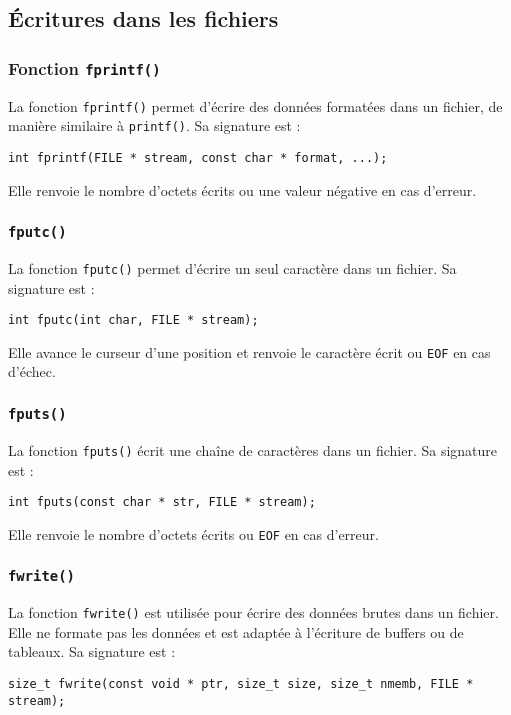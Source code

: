 \documentclass[french,11pt]{article}
\begin{document}
\subsection{Écritures dans les fichiers}

\subsubsection{Fonction \texttt{fprintf()}}
La fonction \texttt{fprintf()} permet d’écrire des données formatées dans un fichier, de manière similaire à \texttt{printf()}. Sa signature est :
\begin{verbatim}
int fprintf(FILE * stream, const char * format, ...);
\end{verbatim}
Elle renvoie le nombre d’octets écrits ou une valeur négative en cas d’erreur.

\subsubsection{\texttt{fputc()}}
La fonction \texttt{fputc()} permet d’écrire un seul caractère dans un fichier. Sa signature est :
\begin{verbatim}
int fputc(int char, FILE * stream);
\end{verbatim}
Elle avance le curseur d’une position et renvoie le caractère écrit ou \texttt{EOF} en cas d’échec.

\subsubsection{\texttt{fputs()}}
La fonction \texttt{fputs()} écrit une chaîne de caractères dans un fichier. Sa signature est :
\begin{verbatim}
int fputs(const char * str, FILE * stream);
\end{verbatim}
Elle renvoie le nombre d’octets écrits ou \texttt{EOF} en cas d’erreur.

\subsubsection{\texttt{fwrite()}}
La fonction \texttt{fwrite()} est utilisée pour écrire des données brutes dans un fichier. Elle ne formate pas les données et est adaptée à l’écriture de buffers ou de tableaux. Sa signature est :
\begin{verbatim}
size_t fwrite(const void * ptr, size_t size, size_t nmemb, FILE * stream);
\end{verbatim}
\end{document}
